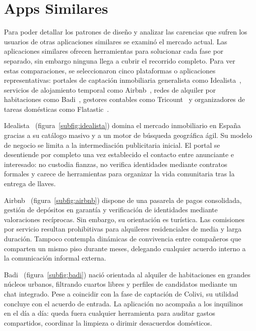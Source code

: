 \section{Apps Similares}
\label{sec:Apps Similares}

    Para poder detallar los patrones de diseño y analizar las carencias que sufren los usuarios de otras aplicaciones similares se examinó el mercado actual. Las aplicaciones similares ofrecen herramientas para solucionar cada fase por separado, sin embargo ninguna llega a cubrir el recorrido completo. Para ver estas comparaciones, se seleccionaron cinco plataformas o aplicaciones representativas: portales de captación inmobiliaria generalista como Idealista~\cite{idealista}, servicios de alojamiento temporal como Airbnb~\cite{airbnb}, redes de alquiler por habitaciones como Badi~\cite{badi}, gestores contables como Tricount~\cite{tricount} y organizadores de tareas domésticas como Flatastic~\cite{flatastic}.

    Idealista~\cite{idealista} (figura~\ref{subfig:idealista}) domina el mercado inmobiliario en España gracias a su catálogo masivo y a un motor de búsqueda geográfica ágil. Su modelo de negocio se limita a la intermediación publicitaria inicial. El portal se desentiende por completo una vez establecido el contacto entre anunciante e interesado: no custodia fianzas, no verifica identidades mediante contratos formales y carece de herramientas para organizar la vida comunitaria tras la entrega de llaves.

    Airbnb~\cite{airbnb} (figura~\ref{subfig:airbnb}) dispone de una pasarela de pagos consolidada, gestión de depósitos en garantía y verificación de identidades mediante valoraciones recíprocas. Sin embargo, su orientación es turística. Las comisiones por servicio resultan prohibitivas para alquileres residenciales de media y larga duración. Tampoco contempla dinámicas de convivencia entre compañeros que comparten un mismo piso durante meses, delegando cualquier acuerdo interno a la comunicación informal externa.

    Badi~\cite{badi} (figura~\ref{subfig:badi}) nació orientada al alquiler de habitaciones en grandes núcleos urbanos, filtrando cuartos libres y perfiles de candidatos mediante un chat integrado. Pese a coincidir con la fase de captación de Colivi, su utilidad concluye con el acuerdo de entrada. La aplicación no acompaña a los inquilinos en el día a día: queda fuera cualquier herramienta para auditar gastos compartidos, coordinar la limpieza o dirimir desacuerdos domésticos.

